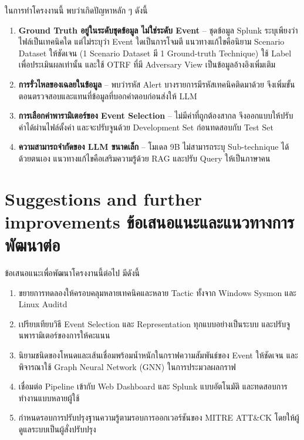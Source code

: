 ในการทำโครงงานนี้ พบว่าเกิดปัญหาหลัก ๆ ดังนี้
\begin{enumerate}
  \item \textbf{Ground Truth อยู่ในระดับชุดข้อมูล ไม่ใช่ระดับ Event} --
        ชุดข้อมูล Splunk ระบุเพียงว่าไฟล์เป็นเทคนิคใด แต่ไม่ระบุว่า Event ใดเป็นการโจมตี
        แนวทางแก้ไขคือนิยาม Scenario Dataset ให้ชัดเจน (1 Scenario Dataset มี 1 Ground-truth Technique)
        ใช้ Label เพื่อประเมินผลเท่านั้น และใช้ OTRF ที่มี Adversary View เป็นข้อมูลอ้างอิงเพิ่มเติม
  \item \textbf{การรั่วไหลของเฉลยในข้อมูล} -- พบว่ารหัส Alert บางรายการมีรหัสเทคนิคติดมาด้วย
        จึงเพิ่มขั้นตอนตรวจสอบและแทนที่ข้อมูลที่บอกคำตอบก่อนส่งให้ LLM
  \item \textbf{การเลือกค่าพารามิเตอร์ของ Event Selection} -- ไม่มีค่าที่ถูกต้องสากล
        จึงออกแบบให้ปรับค่าได้ผ่านไฟล์ตั้งค่า และจะปรับจูนด้วย Development Set ก่อนทดสอบกับ Test Set
  \item \textbf{ความสามารถจำกัดของ LLM ขนาดเล็ก} -- โมเดล 9B ไม่สามารถระบุ Sub-technique ได้ด้วยตนเอง
        แนวทางแก้ไขคือเสริมความรู้ด้วย RAG และปรับ Query ให้เป็นภาษาคน
\end{enumerate}

\section{\ifenglish%
Suggestions and further improvements
\else%
ข้อเสนอแนะและแนวทางการพัฒนาต่อ
\fi
}

ข้อเสนอแนะเพื่อพัฒนาโครงงานนี้ต่อไป มีดังนี้
\begin{enumerate}
  \item ขยายการทดลองให้ครอบคลุมหลายเทคนิคและหลาย Tactic ทั้งจาก Windows Sysmon และ Linux Auditd
  \item เปรียบเทียบวิธี Event Selection และ Representation ทุกแบบอย่างเป็นระบบ และปรับจูนพารามิเตอร์ของการให้คะแนน
  \item นิยามชนิดของโหนดและเส้นเชื่อมพร้อมน้ำหนักในกราฟความสัมพันธ์ของ Event ให้ชัดเจน
        และพิจารณาใช้ Graph Neural Network (GNN) ในการประมวลผลกราฟ
  \item เชื่อมต่อ Pipeline เข้ากับ Web Dashboard และ Splunk แบบอัตโนมัติ และทดสอบการทำงานแบบหลายผู้ใช้
  \item กำหนดรอบการปรับปรุงฐานความรู้ตามรอบการออกเวอร์ชันของ MITRE ATT\&CK
        โดยให้ผู้ดูแลระบบเป็นผู้สั่งปรับปรุง
\end{enumerate}
